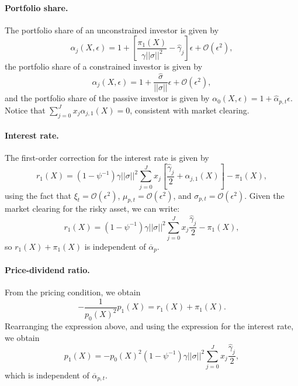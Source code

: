 \paragraph{Portfolio share.} The portfolio share of an unconstrained investor is given by
\begin{equation}
    \alpha_{j}(X,\epsilon) = 1 + \left[ \frac{\pi_1(X)}{\gamma ||\sigma||^2} - \hat{\gamma}_j \right] \epsilon + \mathcal{O}(\epsilon^2),
\end{equation}
the portfolio share of a constrained investor is given by
\begin{equation}
    \alpha_j(X,\epsilon) = 1 + \frac{\hat{\sigma}}{||\sigma||} \epsilon + \mathcal{O}(\epsilon^2),
\end{equation}
and the portfolio share of the passive investor is given by $\alpha_{0}(X,\epsilon) = 1 + \hat{\alpha}_{p,t} \epsilon$. Notice that $\sum_{j=0}^J x_j \alpha_{j,1}(X) = 0$, consistent with market clearing.

\paragraph{Interest rate.} The first-order correction for the interest rate is given by
\begin{equation}
    r_1(X) = \left(1-\psi^{-1}\right) \gamma ||\sigma||^2\sum_{j=0}^J x_j  \left[ \frac{\hat{\gamma}_j}{2} + \alpha_{j,1}(X)\right]  - \pi_1(X),
\end{equation}
using the fact that $\xi_t = \mathcal{O}(\epsilon^2)$, $\mu_{p,t} = \mathcal{O}(\epsilon^2)$, and $\sigma_{p,t} = \mathcal{O}(\epsilon^2)$. 
Given the market clearing for the risky asset, we can write:
\begin{equation}
    r_1(X) = \left(1-\psi^{-1}\right) \gamma ||\sigma||^2\sum_{j=0}^J x_j  \frac{\hat{\gamma}_j}{2}  - \pi_1(X),
\end{equation}
so $r_1(X) + \pi_1(X)$ is independent of $\overline{\alpha}_{p}$.

\paragraph{Price-dividend ratio.} From the pricing condition, we obtain
\begin{equation}
    - \frac{1}{p_0(X)^2} p_1(X) = r_1(X) + \pi_1(X).
\end{equation}
Rearranging the expression above, and using the expression for the interest rate, we obtain
\begin{equation}
    p_1(X) = - p_0(X)^2 \left(1-\psi^{-1}\right) \gamma ||\sigma||^2\sum_{j=0}^J x_j  \frac{\hat{\gamma}_j}{2},
\end{equation}
which is independent of $\overline{\alpha}_{p,t}$.

